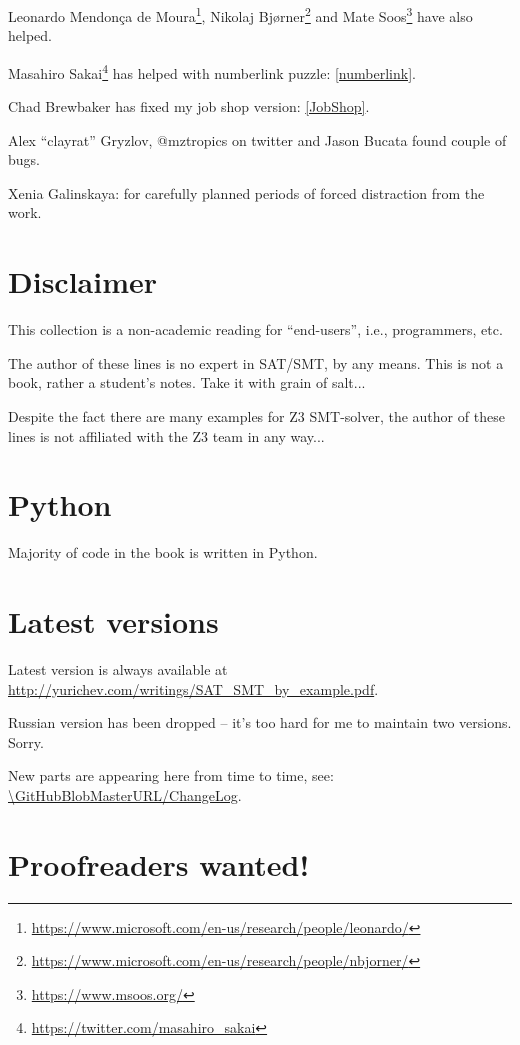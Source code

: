 Leonardo Mendonça de Moura\footnote{\url{https://www.microsoft.com/en-us/research/people/leonardo/}},
Nikolaj Bjørner\footnote{\url{https://www.microsoft.com/en-us/research/people/nbjorner/}}
and Mate Soos\footnote{\url{https://www.msoos.org/}} have also helped.

Masahiro Sakai\footnote{\url{https://twitter.com/masahiro_sakai}} has helped with numberlink puzzle: \ref{numberlink}.

Chad Brewbaker has fixed my job shop version: \ref{JobShop}.

Alex ``clayrat'' Gryzlov, @mztropics on twitter and Jason Bucata found couple of bugs.

Xenia Galinskaya: for carefully planned periods of forced distraction from the work.

\section{Disclaimer}

This collection is a non-academic reading for ``end-users'', i.e., programmers, etc.

The author of these lines is no expert in SAT/SMT, by any means.
This is not a book, rather a student's notes.
Take it with grain of salt...

Despite the fact there are many examples for Z3 SMT-solver,
the author of these lines is not affiliated with the Z3 team in any way...

\section{Python}

Majority of code in the book is written in Python.

\section{Latest versions}

Latest version is always available at \url{http://yurichev.com/writings/SAT_SMT_by_example.pdf}.

Russian version has been dropped -- it's too hard for me to maintain two versions. Sorry.

New parts are appearing here from time to time, see: \url{\GitHubBlobMasterURL/ChangeLog}.

\section{Proofreaders wanted!}

